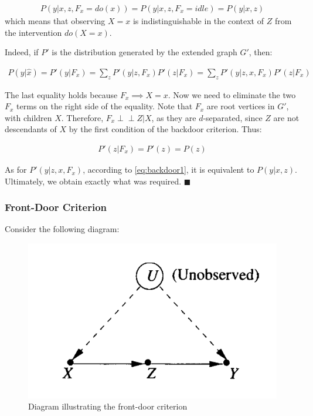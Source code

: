 \documentclass[fleqn]{article}
\newcommand{\independent}{\perp \!\!\! \perp}
\numberwithin{equation}{section}
\numberwithin{theorem}{section}
\numberwithin{figure}{section}
\numberwithin{lemma}{section}
\numberwithin{corollary}{section}
\begin{document}
\begin{align}
	P(y|x, z, F_x = do(x)) = P(y | x, z, F_x = idle) = P(y|x, z)
	\label{eq:backdoor1}
\end{align}
which means that observing $X=x$ is indistinguishable in the context of $Z$ from the intervention $do(X = x)$.

Indeed, if $P'$ is the distribution generated by the extended graph $G'$, then:

\begin{align}
	P(y|\hat x) = P'(y|F_x) = \sum\limits_{z}P'(y|z, F_x)P'(z|F_x) = \sum\limits_{z}P'(y|z, x, F_x)P'(z|F_x)
\end{align}

The last equality holds because $F_x \implies X = x$. Now we need to eliminate the two $F_x$ terms on the right side of the equality. Note that $F_x$ are root vertices in $G'$, with children $X$. Therefore, $F_x \independent Z | X$, as they are $d$-separated, since $Z$ are not descendants of $X$ by the first condition of the backdoor criterion. Thus:

\begin{align}
	P'(z|F_x) = P'(z) = P(z)
\end{align}

As for $P'(y|z, x, F_x)$, according to \ref{eq:backdoor1}, it is equivalent to $P(y|x,z)$. Ultimately, we obtain exactly what was required. $\blacksquare$

\subsubsection*{Front-Door Criterion}

Consider the following diagram:
\begin{figure}[h]
	\begin{center}
		\includegraphics[scale=0.6]{imgs/img20.png}
	\end{center}
	\caption{Diagram illustrating the front-door criterion}
	\label{fig:frontdoor1}
\end{figure}
\end{document}
